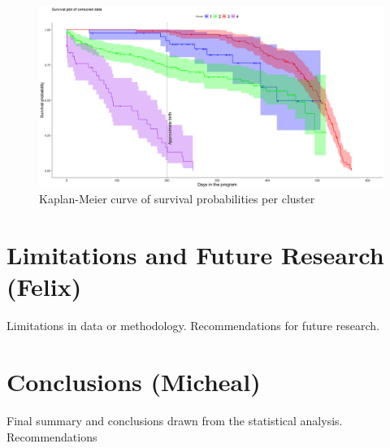 \documentclass[12pt]{article}
\begin{document}
		\begin{figure}[h]
			\begin{center}
				\includegraphics[width=150mm]{images/censored, birth.png}
				\caption{Kaplan-Meier curve of survival probabilities per cluster}
				\label{fig:cens_surv}
			\end{center}
		\end{figure}



\section{Limitations and Future Research (Felix)}

Limitations in data or methodology.
Recommendations for future research.

\section{Conclusions (Micheal)}

Final summary and conclusions drawn from the statistical analysis.
Recommendations


\newpage
%
%

\setlength{\bibhang}{0pt}

\raggedright

\end{document}
